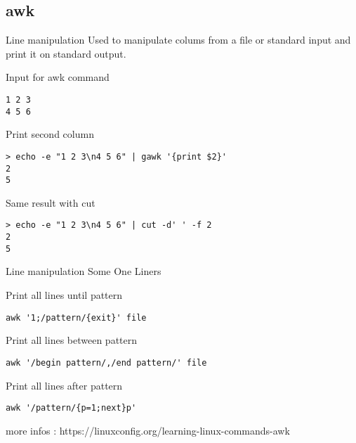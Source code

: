 \subsection{awk}

\begin{frame}[fragile]{Line manipulation}
Used to manipulate colums from a file or standard input and print it on standard output.
  \pause
  \begin{exampleblock}{Input for awk command}
    \begin{lstlisting}[showstringspaces=false,basicstyle=\tiny]
1 2 3
4 5 6
    \end{lstlisting}
  \end{exampleblock}

  \pause

  \begin{exampleblock}{Print second column}
    \begin{lstlisting}[showstringspaces=false,basicstyle=\tiny]
> echo -e "1 2 3\n4 5 6" | gawk '{print $2}'
2
5
    \end{lstlisting}
  \end{exampleblock}
  \pause
  \begin{exampleblock}{Same result with cut}
    \begin{lstlisting}[showstringspaces=false,basicstyle=\tiny]
> echo -e "1 2 3\n4 5 6" | cut -d' ' -f 2
2
5
    \end{lstlisting}
  \end{exampleblock}
\pause

\end{frame}

\begin{frame}[fragile]{Line manipulation}
Some One Liners
  \pause
  \begin{exampleblock}{Print all lines until pattern}
    \begin{lstlisting}[showstringspaces=false]
awk '1;/pattern/{exit}' file
    \end{lstlisting}
  \end{exampleblock}
  \pause

  \begin{exampleblock}{Print all lines between pattern}
    \begin{lstlisting}[showstringspaces=false]
awk '/begin pattern/,/end pattern/' file
    \end{lstlisting}
  \end{exampleblock}
  \pause

  \begin{exampleblock}{Print all lines after pattern}
    \begin{lstlisting}[showstringspaces=false]
awk '/pattern/{p=1;next}p'
    \end{lstlisting}
  \end{exampleblock}
\pause

more infos : https://linuxconfig.org/learning-linux-commands-awk
\end{frame}

